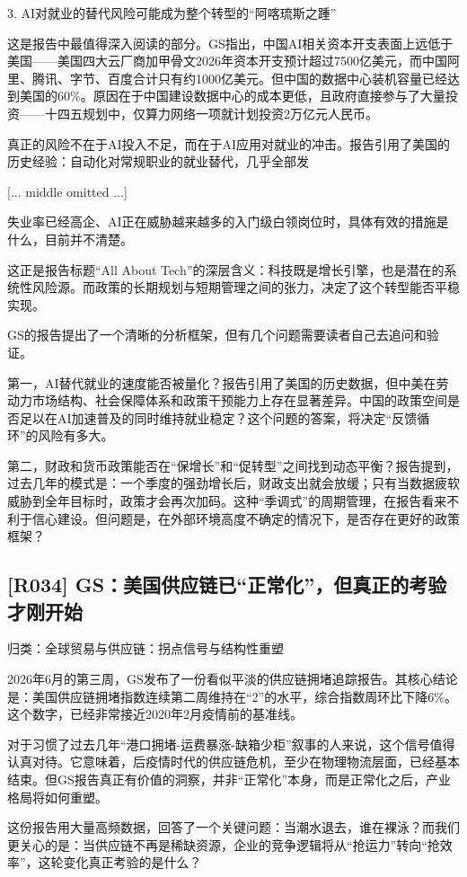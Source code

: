 \documentclass[11pt]{ctexart}
\begin{document}
3. AI对就业的替代风险可能成为整个转型的“阿喀琉斯之踵”

这是报告中最值得深入阅读的部分。GS指出，中国AI相关资本开支表面上远低于美国——美国四大云厂商加甲骨文2026年资本开支预计超过7500亿美元，而中国阿里、腾讯、字节、百度合计只有约1000亿美元。但中国的数据中心装机容量已经达到美国的60\%。原因在于中国建设数据中心的成本更低，且政府直接参与了大量投资——十四五规划中，仅算力网络一项就计划投资2万亿元人民币。

真正的风险不在于AI投入不足，而在于AI应用对就业的冲击。报告引用了美国的历史经验：自动化对常规职业的就业替代，几乎全部发

[... middle omitted ...]

失业率已经高企、AI正在威胁越来越多的入门级白领岗位时，具体有效的措施是什么，目前并不清楚。

这正是报告标题“All About Tech”的深层含义：科技既是增长引擎，也是潜在的系统性风险源。而政策的长期规划与短期管理之间的张力，决定了这个转型能否平稳实现。

GS的报告提出了一个清晰的分析框架，但有几个问题需要读者自己去追问和验证。

第一，AI替代就业的速度能否被量化？报告引用了美国的历史数据，但中美在劳动力市场结构、社会保障体系和政策干预能力上存在显著差异。中国的政策空间是否足以在AI加速普及的同时维持就业稳定？这个问题的答案，将决定“反馈循环”的风险有多大。

第二，财政和货币政策能否在“保增长”和“促转型”之间找到动态平衡？报告提到，过去几年的模式是：一个季度的强劲增长后，财政支出就会放缓；只有当数据疲软威胁到全年目标时，政策才会再次加码。这种“季调式”的周期管理，在报告看来不利于信心建设。但问题是，在外部环境高度不确定的情况下，是否存在更好的政策框架？

\subsection{[R034] GS：美国供应链已“正常化”，但真正的考验才刚开始}
{\small\color{refgray}归类：全球贸易与供应链：拐点信号与结构性重塑}

2026年6月的第三周，GS发布了一份看似平淡的供应链拥堵追踪报告。其核心结论是：美国供应链拥堵指数连续第二周维持在“2”的水平，综合指数周环比下降6\%。 这个数字，已经非常接近2020年2月疫情前的基准线。

对于习惯了过去几年“港口拥堵-运费暴涨-缺箱少柜”叙事的人来说，这个信号值得认真对待。它意味着，后疫情时代的供应链危机，至少在物理物流层面，已经基本结束。但GS报告真正有价值的洞察，并非“正常化”本身，而是正常化之后，产业格局将如何重塑。

这份报告用大量高频数据，回答了一个关键问题：当潮水退去，谁在裸泳？而我们更关心的是：当供应链不再是稀缺资源，企业的竞争逻辑将从“抢运力”转向“抢效率”，这轮变化真正考验的是什么？
\end{document}
